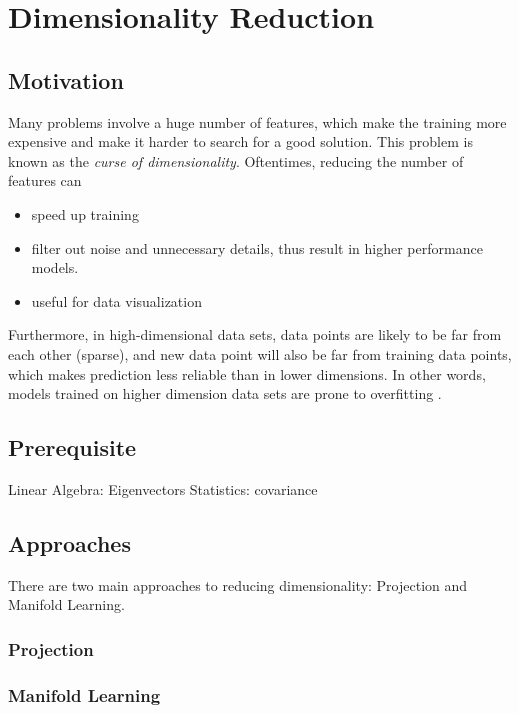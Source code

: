 \documentclass[8pt,letterpaper]{book}
\begin{document}
\chapter{Dimensionality Reduction}

\section{Motivation}
Many problems involve a huge number of features, which make the training more expensive and make it harder to search for a good solution. This problem is known as the \textit{curse of dimensionality}. Oftentimes, reducing the number of features can 

\begin{itemize}
    \item speed up training
    \item filter out noise and unnecessary details, thus result in higher performance models.
    \item useful for data visualization
\end{itemize}

Furthermore, in high-dimensional data sets, data points are likely to be far from each other (sparse), and new data point will also be far from training data points, which makes prediction less reliable than in lower dimensions. In other words, models trained on higher dimension data sets are prone to overfitting \cite{Geron19}.

\section{Prerequisite}
Linear Algebra: Eigenvectors
Statistics: covariance

\section{Approaches}
There are two main approaches to reducing dimensionality: Projection and Manifold Learning.

\subsection{Projection}

\subsection{Manifold Learning}








\end{document}
